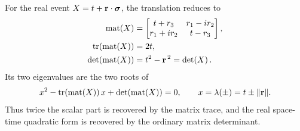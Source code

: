 For the real event
\(X=t+\mathbf{r}\cdot\mathbf{\bm{\sigma}}\), the translation reduces to
\begin{align}
\operatorname{mat}\!\left(X\right)
&=
\begin{bmatrix}
t+r_3&r_1-ir_2\\
r_1+ir_2&t-r_3
\end{bmatrix},
\notag\\
\operatorname{tr}(\operatorname{mat}\!\left(X\right))
&=2t,
\notag\\
\operatorname{det}\!\left(\operatorname{mat}\!\left(X\right)\right)
&=t^2-\mathbf{r}^{\,2}
=\operatorname{det}\!\left(X\right).
\label{eq:matrix-X}
\end{align}
Its two eigenvalues are the two roots of
\begin{equation}
x^2-\operatorname{tr}(\operatorname{mat}\!\left(X\right))\,x
+\operatorname{det}\!\left(\operatorname{mat}\!\left(X\right)\right)=0,
\qquad
x=\lambda(\pm)=t\pm\lVert\mathbf{r}\rVert.
\label{eq:matrix-X-eigenvalues}
\end{equation}
Thus twice the scalar part is recovered by the matrix trace, and the real
space-time quadratic form is recovered by the ordinary matrix determinant.
